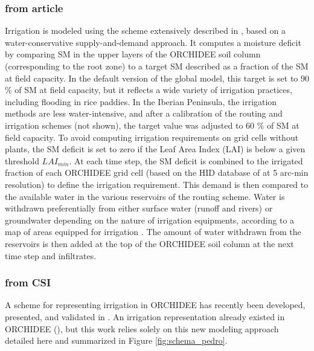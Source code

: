 \subsubsection{from article}
Irrigation is modeled using the scheme extensively described in \cite{arboleda-obando_validation_2024}, based on a water-conservative supply-and-demand approach.
It computes a moisture deficit by comparing SM in the upper layers of the ORCHIDEE soil column (corresponding to the root zone) to a target SM described as a fraction of the SM at field capacity.
In the default version of the global model, this target is set to 90 \% of SM at field capacity, but it reflects a wide variety of irrigation practices, including flooding in rice paddies. In the Iberian Peninsula, the irrigation methods are less water-intensive, and after a calibration of the routing and irrigation schemes (not shown), the target value was adjusted to 60 \% of SM at field capacity. 
To avoid computing irrigation requirements on grid cells without plants, the SM deficit is set to zero if the Leaf Area Index (LAI) is below a given threshold $LAI_{min}$.
At each time step, the SM deficit is combined to the irrigated fraction of each ORCHIDEE grid cell (based on the HID database of \cite{siebert_quantifying_2010} at 5 arc-min resolution) to define the irrigation requirement. 
This demand is then compared to the available water in the various reservoirs of the routing scheme. Water is withdrawn preferentially from either surface water (runoff and rivers) or groundwater depending on the nature of irrigation equipments, according to a map of areas equipped for irrigation \citep{siebert_groundwater_2010}.
The amount of water withdrawn from the reservoirs is then added at the top of the ORCHIDEE soil column at the next time step and infiltrates.

\subsubsection{from CSI}
A scheme for representing irrigation in ORCHIDEE has recently been developed, presented, and validated in \cite{arboleda-obando_validation_2024}. An irrigation representation already existed in ORCHIDEE (\cite{de_rosnay_integrated_2003, guimberteau_global_2012}), but this work relies solely on this new modeling approach detailed here and summarized in Figure \ref{fig:schema_pedro}.

